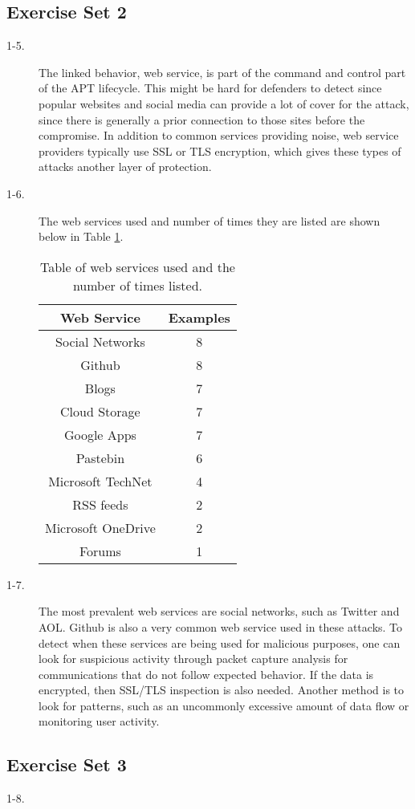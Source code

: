 \documentclass[11pt]{article}
\begin{document}
\subsection*{Exercise Set 2}
\begin{description}
  \item[1-5.] The linked behavior, web service, is part of the command and control part of the APT lifecycle. This might be
    hard for defenders to detect since popular websites and social media can provide a lot of cover for the attack, since there
    is generally a prior connection to those sites before the compromise. In addition to common services providing noise, web
    service providers typically use SSL or TLS encryption, which gives these types of attacks another layer of protection.
  \item[1-6.] The web services used and number of times they are listed are shown below in Table \ref{table:services}.
    \begin{table}[h!]
      \centering
      \begin{tabular}{ c c }
      \hline
      Web Service & Examples \\
      \hline
      Social Networks & 8 \\
      Github & 8 \\
      Blogs & 7 \\
      Cloud Storage & 7 \\
      Google Apps & 7 \\
      Pastebin & 6 \\
      Microsoft TechNet & 4 \\
      RSS feeds & 2 \\
      Microsoft OneDrive & 2 \\
      Forums & 1 \\
      \hline
      \end{tabular}
      \caption{Table of web services used and the number of times listed.}
      \label{table:services}
    \end{table}
  \item[1-7.] The most prevalent web services are social networks, such as Twitter and AOL. Github is also a very common web
    service used in these attacks. To detect when these services are being used for malicious purposes, one can look for
    suspicious activity through packet capture analysis for communications that do not follow expected behavior. If the data
    is encrypted, then SSL/TLS inspection is also needed. Another method is to look for patterns, such as an uncommonly
    excessive amount of data flow or monitoring user activity.
\end{description}
\subsection*{Exercise Set 3}
\begin{description}
  \item[1-8.]
\end{description}

% 
% 
\end{document}
